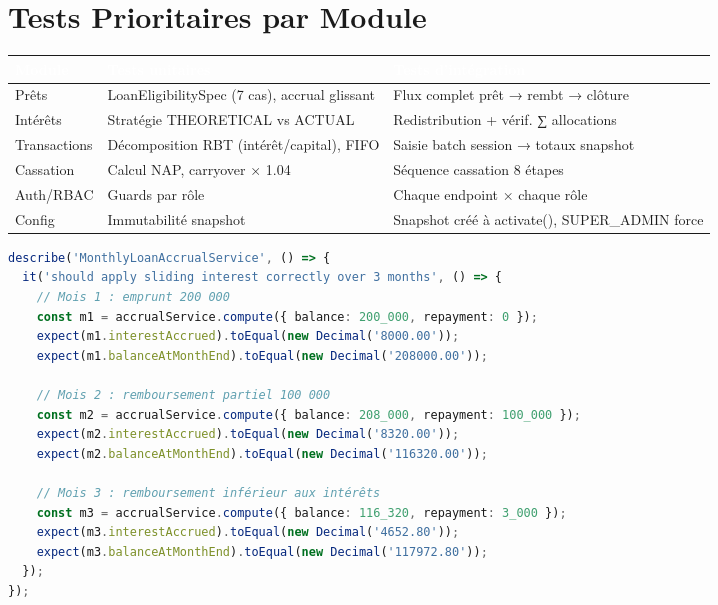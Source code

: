 \documentclass[12pt, a4paper]{report}
\begin{document}
\section{Tests Prioritaires par Module}

\begin{center}
\small
{}
\begin{tabular}{L{3cm}L{5cm}L{5cm}}
  \toprule
  \textcolor{white}{\textbf{Module}} &
  \textcolor{white}{\textbf{Tests unitaires}} &
  \textcolor{white}{\textbf{Tests d'intégration}} \\
  \midrule
  Prêts         & LoanEligibilitySpec (7 cas), accrual glissant & Flux complet prêt → rembt → clôture \\
  Intérêts      & Stratégie THEORETICAL vs ACTUAL & Redistribution + vérif. ∑ allocations \\
  Transactions  & Décomposition RBT (intérêt/capital), FIFO & Saisie batch session → totaux snapshot \\
  Cassation     & Calcul NAP, carryover × 1.04 & Séquence cassation 8 étapes \\
  Auth/RBAC     & Guards par rôle & Chaque endpoint × chaque rôle \\
  Config        & Immutabilité snapshot & Snapshot créé à activate(), SUPER\_ADMIN force \\
  \bottomrule
\end{tabular}
\end{center}

\begin{lstlisting}[language=TypeScript, caption={Exemple test unitaire — Accrual glissant}]
describe('MonthlyLoanAccrualService', () => {
  it('should apply sliding interest correctly over 3 months', () => {
    // Mois 1 : emprunt 200 000
    const m1 = accrualService.compute({ balance: 200_000, repayment: 0 });
    expect(m1.interestAccrued).toEqual(new Decimal('8000.00'));
    expect(m1.balanceAtMonthEnd).toEqual(new Decimal('208000.00'));

    // Mois 2 : remboursement partiel 100 000
    const m2 = accrualService.compute({ balance: 208_000, repayment: 100_000 });
    expect(m2.interestAccrued).toEqual(new Decimal('8320.00'));
    expect(m2.balanceAtMonthEnd).toEqual(new Decimal('116320.00'));

    // Mois 3 : remboursement inférieur aux intérêts
    const m3 = accrualService.compute({ balance: 116_320, repayment: 3_000 });
    expect(m3.interestAccrued).toEqual(new Decimal('4652.80'));
    expect(m3.balanceAtMonthEnd).toEqual(new Decimal('117972.80'));
  });
});
\end{lstlisting}
\end{document}
